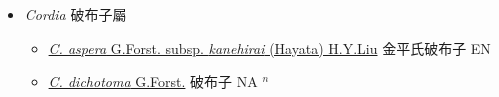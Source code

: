 
  \begin{itemize}
 \item[] \textit{Cordia} 破布子屬
                    
  \begin{itemize}
        \item[] \href{http://www.theplantlist.org/tpl1.1/search?q=Cordia+aspera+subsp.+kanehirai}{\textit{C. aspera} G.Forst. subsp. \textit{kanehirai} (Hayata) H.Y.Liu}   金平氏破布子 EN
        \item[] \href{http://www.theplantlist.org/tpl1.1/search?q=Cordia+dichotoma}{\textit{C. dichotoma} G.Forst.}   破布子 NA $^n$
  \end{itemize}
  \end{itemize}
